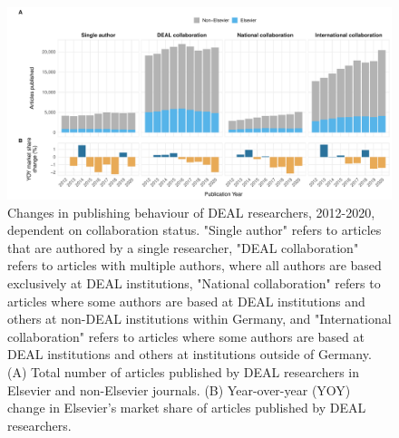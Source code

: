 \documentclass[
]{article}
\begin{document}
\begin{figure}

{\centering \includegraphics{analysis_files/figure-latex/items-publisher-year-collaboration-1} 

}

\caption{Changes in publishing behaviour of DEAL researchers, 2012-2020, dependent on collaboration status. "Single author" refers to articles that are authored by a single researcher, "DEAL collaboration" refers to articles with multiple authors, where all authors are based exclusively at DEAL institutions, "National collaboration" refers to articles where some authors are based at DEAL institutions and others at non-DEAL institutions within Germany, and "International collaboration" refers to articles where some authors are based at DEAL institutions and others at institutions outside of Germany. (A) Total number of articles published by DEAL researchers in Elsevier and non-Elsevier journals. (B) Year-over-year (YOY) change in Elsevier's market share of articles published by DEAL researchers.}\label{fig:items-publisher-year-collaboration}
\end{figure}
\end{document}
